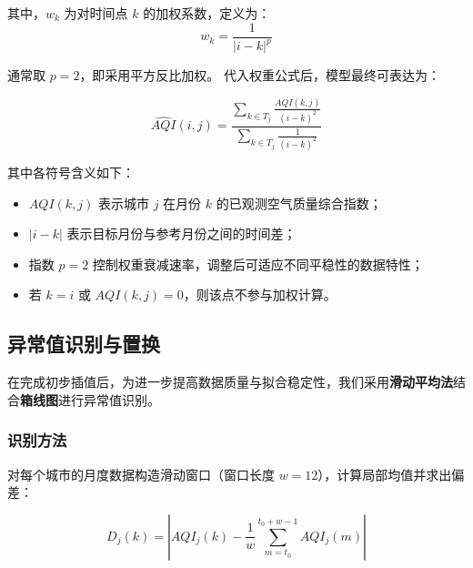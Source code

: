 \documentclass[a4paper,12pt]{article}
\begin{document}
	其中，$w_k$ 为对时间点 $k$ 的加权系数，定义为：
	\[
	w_k = \frac{1}{|i - k|^p}
	\]
	
	通常取 $p=2$，即采用平方反比加权。
	代入权重公式后，模型最终可表达为：
	
	\begin{equation}
		\widehat{AQI}(i,j) = \frac{\displaystyle\sum_{k \in T_j} \frac{AQI(k,j)}{(i - k)^2}}{\displaystyle\sum_{k \in T_j} \frac{1}{(i - k)^2}}
		\label{eq:time_idw_simple}
	\end{equation}
	
	其中各符号含义如下：
	
	\begin{itemize}
		\item $AQI(k,j)$ 表示城市 $j$ 在月份 $k$ 的已观测空气质量综合指数；
		\item $|i - k|$ 表示目标月份与参考月份之间的时间差；
		\item 指数 $p=2$ 控制权重衰减速率，调整后可适应不同平稳性的数据特性；
		\item 若 $k = i$ 或 $AQI(k,j)=0$，则该点不参与加权计算。
	\end{itemize}
	
	
	\subsection{异常值识别与置换}
	
	在完成初步插值后，为进一步提高数据质量与拟合稳定性，我们采用\textbf{滑动平均法}结合\textbf{箱线图}进行异常值识别。
	
	\subsubsection{识别方法}
	
	对每个城市的月度数据构造滑动窗口（窗口长度 $w=12$），计算局部均值并求出偏差：
	
	\begin{equation}
		D_j(k) = \left| AQI_j(k) - \frac{1}{w} \sum_{m = t_0}^{t_0 + w - 1} AQI_j(m) \right|
	\end{equation}
	
\end{document}
